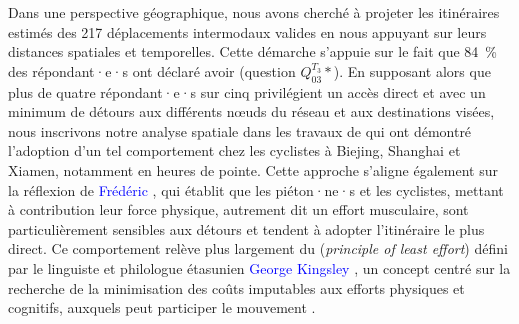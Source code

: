 \begin{refsegment}
Dans une perspective géographique, nous avons cherché à projeter les itinéraires estimés des 217 déplacements intermodaux valides en nous appuyant sur leurs distances spatiales et temporelles. Cette démarche s’appuie sur le fait que 84~\% des répondant·e·s ont déclaré avoir  (question \(Q_{03}^{T_{3}}*\)). En supposant alors que plus de quatre répondant·e·s sur cinq privilégient un accès direct et avec un minimum de détours aux différents nœuds du réseau et aux destinations visées, nous inscrivons notre analyse spatiale dans les travaux de \textcolor{blue}{\textcite[2, 7]{qiu_understanding_2022}} qui ont démontré l'adoption d'un tel comportement chez les cyclistes à Biejing, Shanghai et Xiamen, notamment en heures de pointe. Cette approche s’aligne également sur la réflexion de \textcolor{blue}{Frédéric} \textcolor{blue}{\textcite[115]{heran_distances_2009}}, qui établit que les piéton·ne·s et les cyclistes, mettant à contribution leur force physique, autrement dit un effort musculaire, sont particulièrement sensibles aux détours et tendent à adopter l’itinéraire le plus direct. Ce comportement relève plus largement du  (\textsl{principle of least effort}) défini par le linguiste et philologue étasunien \textcolor{blue}{George Kingsley} \textcolor{blue}{\textcite[348]{zipf_human_1949}}, un concept centré sur la recherche de la minimisation des coûts imputables aux efforts physiques et cognitifs, auxquels peut participer le mouvement \textcolor{blue}{\autocite[348]{zhu_principle_2018}}.%


\end{refsegment}
